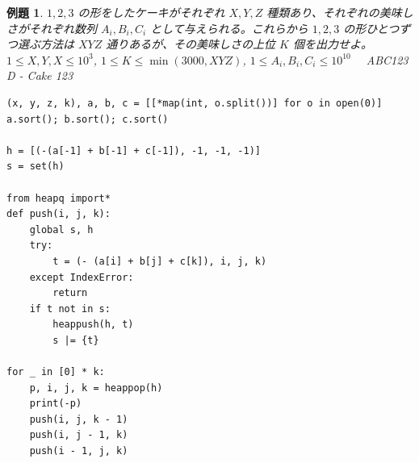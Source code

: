 \documentclass[12pt, a4j]{ltjsarticle}
\newtheorem{exm}[thm]{例題}
\newcommand*{\SS}{\vspace{1cm}}
\begin{document}
\SS

\begin{exm} \upshape $1,2,3$ の形をしたケーキがそれぞれ $X,Y,Z$ 種類あり、それぞれの美味しさがそれぞれ数列 $A_i,B_i,C_i$ として与えられる。これらから $1,2,3$ の形ひとつずつ選ぶ方法は $XYZ$ 通りあるが、その美味しさの上位 $K$ 個を出力せよ。$1\le X,Y,X\le 10^3$, $1\le K\le \min (3000, XYZ)$, $1\le A_i,B_i,C_i \le 10^{10}$ 　ABC123 D - Cake 123\\
\begin{lstlisting}
(x, y, z, k), a, b, c = [[*map(int, o.split())] for o in open(0)]
a.sort(); b.sort(); c.sort()

h = [(-(a[-1] + b[-1] + c[-1]), -1, -1, -1)]
s = set(h)

from heapq import*
def push(i, j, k):
    global s, h
    try:
        t = (- (a[i] + b[j] + c[k]), i, j, k)
    except IndexError:
        return
    if t not in s:
        heappush(h, t)
        s |= {t}

for _ in [0] * k:
    p, i, j, k = heappop(h)
    print(-p)
    push(i, j, k - 1)
    push(i, j - 1, k)
    push(i - 1, j, k)
\end{lstlisting}
\end{exm}

\SS
\end{document}
